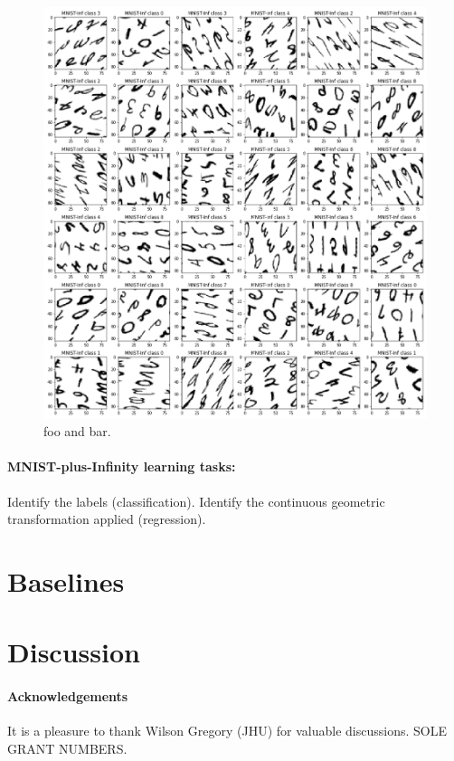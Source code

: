 \documentclass{article}
\begin{document}
\begin{figure}[t!]
\includegraphics[width=\textwidth]{../notebooks/MNIST-Inf.png}
\caption{foo and bar.\label{fig:Inf}}
\end{figure}

\paragraph{MNIST-plus-Infinity learning tasks:} Identify the labels (classification). Identify the continuous geometric transformation applied (regression).

\section{Baselines}

\section{Discussion}

\paragraph{Acknowledgements}
It is a pleasure to thank
  Wilson Gregory (JHU)
for valuable discussions.
SOLE GRANT NUMBERS.


\raggedright

\end{document}
